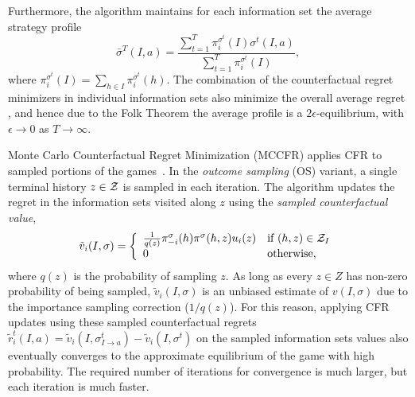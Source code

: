 Furthermore, the algorithm maintains for each information set the average   strategy profile
\begin{equation}
\bar{\sigma}^T(I,a) = \frac{\sum_{t=1}^T \pi^{\sigma^t}_i(I) \sigma^t(I,a)}{\sum_{t=1}^T \pi^{\sigma^t}_i(I)},
\end{equation}
where $\pi^{\sigma^t}_i(I) = \sum_{h \in I}\pi^{\sigma^t}_i(h)$.
The combination of the counterfactual regret minimizers in individual information sets also minimize the overall
average regret \cite{CFR}, and hence due to the Folk Theorem the average profile is a  $2\epsilon$-equilibrium,
with $\epsilon \rightarrow 0$ as $T \rightarrow \infty$.

Monte Carlo Counterfactual Regret Minimization (MCCFR) applies CFR to sampled portions of the games~\cite{Lanctot09Sampling}.
In the {\it outcome sampling} (OS) variant, a single terminal history $z\in \mathcal{Z}$ is sampled in each iteration.
The algorithm updates the regret in the information sets visited along $z$ using the
{\it sampled counterfactual value},
\begin{equation}
\tilde{v}_i(I,\sigma) = \left\{
\begin{array}{ll}
\frac{1}{q(z)} \pi^{\sigma}_{-i}(h) \pi^{\sigma}(h,z) u_i(z) & \mbox{if } (h,z) \in \mathcal{Z}_I\\
0  & \mbox{otherwise,}
\end{array} \right.
\label{eq:scv}
\end{equation}
where $q(z)$ is the probability of sampling $z$.
As long as every $z \in Z$ has non-zero probability of being sampled, $\tilde{v}_i(I,\sigma)$ is an unbiased estimate of $v(I,\sigma)$
due to the importance sampling correction ($1/q(z)$). For this reason, applying CFR updates using these sampled counterfactual regrets
$\tilde{r}_i^t(I,a) = \tilde{v}_i(I,\sigma^t_{I \rightarrow a}) - \tilde{v}_i(I,\sigma^t)$
on the sampled information sets values also eventually converges to the approximate equilibrium of the game with high probability.
The required number of iterations for convergence is much larger, but each iteration is much faster.



